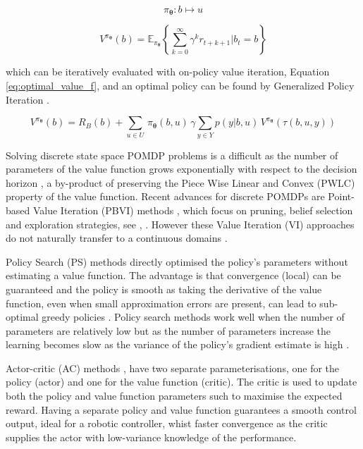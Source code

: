 \documentclass[final,5p,times,twocolumn]{elsarticle}
\newcommand{\Param}{\boldsymbol{\theta}}
\begin{document}
\begin{equation}\label{eq:policy}
  \pi_{\Param} : b \mapsto u
\end{equation}

\begin{equation}\label{eq:expected_reward_back}
 V^{\pi_{\Param}}(b) = \mathbb{E}_{\pi_{\Param}} \left\{  \sum^{\infty}_{k=0} \gamma^k r_{t+k+1} \Bigg\lvert b_t = b \right\}
\end{equation}

which can be iteratively evaluated with on-policy value iteration, Equation \ref{eq:optimal_value_f}, and an optimal policy can be found 
by Generalized Policy Iteration \cite[Chap. 4.6]{sutton1998reinforcement}.

\begin{equation} \label{eq:optimal_value_f}
  V^{\pi_{\Param}}(b) = R_B(b) + \sum\limits_{u \in U}\, \pi_{\Param}(b,u)\, \gamma \sum\limits_{y\in Y} p(y|b,u)\, V^{\pi_{\Param}}(\tau(b,u,y))
\end{equation}

Solving discrete state space POMDP problems is a difficult as the number of parameters of the value function grows 
exponentially with respect to the decision horizon \cite[Chap. 15]{Thrun_Burgard_Fox_2005}\cite{Sondik_1973},
a by-product of preserving the Piece Wise Linear and Convex (PWLC) property of the value function. Recent 
advances for discrete POMDPs are  Point-based Value Iteration (PBVI) methods \cite{PBVI_2003}, which focus
on pruning, belief selection and exploration strategies, see \cite{Veiga14aaai}, \cite{POMDP_approach_2010}.
However these Value Iteration (VI) approaches do not naturally transfer to a 
continuous domains \cite{cPBVI_2006}. 

Policy Search (PS) methods \cite{p_search_surv_2011} directly optimised the policy's parameters without estimating 
a value function. The advantage is that convergence (local) can be guaranteed and the policy is smooth as taking the derivative of 
the value function, even when small approximation errors are present, can lead to sub-optimal greedy policies 
\cite{Baxter_GPOMDP_2000}. Policy search methods work well when the number of parameters are relatively low but 
as the number of parameters increase the learning becomes slow as the variance of the policy's gradient estimate 
is high \cite{rl_ac_surv_2012}. 

Actor-critic (AC) methods \cite[Chap. 6.6]{sutton1998reinforcement},\cite{rl_ac_surv_2012} have two 
separate parameterisations, one for the policy (actor) and one for the value function (critic). The critic 
is used to update both the policy and value function parameters such to maximise the expected reward. 
Having a separate policy and value function guarantees a smooth control output, ideal for a robotic controller, whist 
faster convergence as the critic supplies the actor with low-variance knowledge of the performance.
\end{document}
